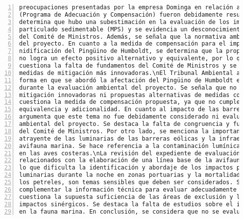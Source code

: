 \begin{Verbatim}[frame=lines, label=Elavoración propia -  Ejemplo de Contexto enviado por el Chatbot a OpenAI
				, fontsize=\footnotesize, numbers=left
				, baselinestretch=0.4
				, formatcom=\color{gray}]
preocupaciones presentadas por la empresa Dominga en relación a las preocupaciones PAC
(Programa de Adecuación y Compensación) fueron debidamente resueltas. Sin embargo, se
determina que hubo una subestimación en la evaluación de los impactos por aporte de material
particulado sedimentable (MPS) y se evidencia un desconocimiento de los antecedentes por parte
del Comité de Ministros. Además, se señala que la normativa ambiental no se adecúa al contexto
del proyecto. En cuanto a la medida de compensación para el impacto en el proceso de
nidificación del Pingüino de Humboldt, se determina que la propuesta presentada por la empresa
no logra un efecto positivo alternativo y equivalente, por lo que se acoge la reclamación. Se
cuestiona la falta de fundamentos del Comité de Ministros y se sugiere la implementación de
medidas de mitigación más innovadoras.\nEl Tribunal Ambiental advierte una debilidad en la
forma en que se abordó la afectación del Pingüino de Humboldt en el islote Totoralillo Norte
durante la evaluación ambiental del proyecto. Se señala que no se consideraron medidas de
mitigación innovadoras ni propuestas alternativas de medidas compensatorias. Además, se
cuestiona la medida de compensación propuesta, ya que no cumple con los requisitos de
equivalencia y adicionalidad. En cuanto al impacto de las barreras eólicas en la avifauna, se
argumenta que este tema no fue debidamente considerado ni evaluado durante la evaluación
ambiental del proyecto. Se destaca la falta de congruencia y fundamentación en la resolución
del Comité de Ministros. Por otro lado, se menciona la importancia de evaluar el efecto
atrayente de las luminarias de las barreras eólicas y la infraestructura portuaria en la
avifauna marina. Se hace referencia a la contaminación lumínica y sus efectos desorientadores
en las aves costeras.\nLa revisión del expediente de evaluación ambiental no muestra estudios
relacionados con la elaboración de una línea base de la avifauna en los sectores mencionados,
lo que dificulta la identificación y abordaje de los impactos potenciales. El uso de
luminarias durante la noche en zonas portuarias y la mortalidad de aves marinas, especialmente
los petreles, son temas sensibles que deben ser considerados. Se advierte la oportunidad de
complementar la información técnica para evaluar adecuadamente estos impactos. Además, se
cuestiona la supuesta suficiencia de las áreas de exclusión y la falta de consideración de los
impactos sinérgicos. Se destaca la falta de estudios sobre el impacto acústico de los buques
en la fauna marina. En conclusión, se considera que no se evaluaron adecuadamente los impactos

\end{Verbatim}
